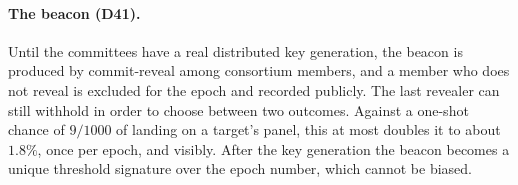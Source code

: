 \paragraph{The beacon (D41).} Until the committees have a real distributed key generation, the
beacon is produced by commit-reveal among consortium members, and a member who does not reveal is
excluded for the epoch and recorded publicly. The last revealer can still withhold in order to
choose between two outcomes. Against a one-shot chance of $9/1000$ of landing on a target's panel,
this at most doubles it to about $1.8\%$, once per epoch, and visibly. After the key generation the
beacon becomes a unique threshold signature over the epoch number, which cannot be biased.
